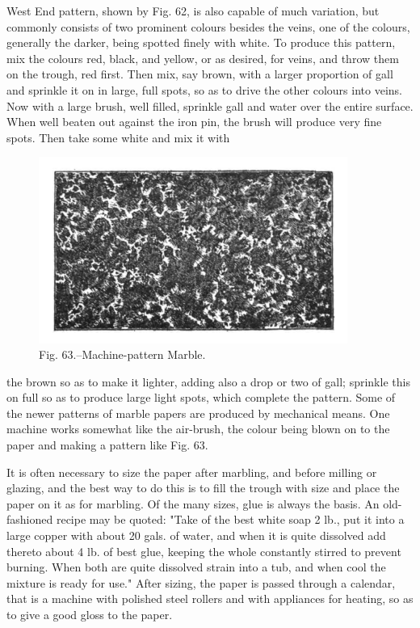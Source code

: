 \documentclass[twoside]{book}
\begin{document}
West End pattern, shown by Fig. 62, is also
capable of much variation, but commonly consists
of two prominent colours besides the veins, one of
the colours, generally the darker, being spotted
\pagebreak
finely with white. To produce this pattern, mix
the colours red, black, and yellow, or as desired,
for veins, and throw them on the trough, red first.
Then mix, say brown, with a larger proportion of
gall and sprinkle it on in large, full spots, so as
to drive the other colours into veins. Now with
a large brush, well filled, sprinkle gall and water
over the entire surface. When well beaten out
against the iron pin, the brush will produce very
fine spots. Then take some white and mix it with
	\begin{figure}[h]
		\centering
		\includegraphics[width=0.9\textwidth]{Figures/_063.png}
		\caption*{Fig. 63.--Machine-pattern Marble.}
	\end{figure}
the brown so as to make it lighter, adding also a
drop or two of gall; sprinkle this on full so as to
produce large light spots, which complete the pattern.
Some of the newer patterns of marble papers
are produced by mechanical means. One machine
works somewhat like the air-brush, the colour being
blown on to the paper and making a pattern like
Fig. 63.

It is often necessary to size the paper after
marbling, and before milling or glazing, and the
best way to do this is to fill the trough with size
and place the paper on it as for marbling. Of the
many sizes, glue is always the basis. An old-fashioned
\pagebreak
recipe may be quoted: "Take of the best
white soap 2 lb., put it into a large copper with
about 20 gals. of water, and when it is quite
dissolved add thereto about 4 lb. of best glue,
keeping the whole constantly stirred to prevent burning.
When both are quite dissolved strain into a tub,
and when cool the mixture is ready for use." After
sizing, the paper is passed through a calendar, that
is a machine with polished steel rollers and with
appliances for heating, so as to give a good gloss
to the paper.
\end{document}
